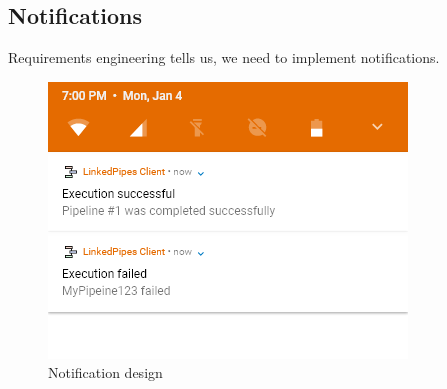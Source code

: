 \subsection{Notifications}
Requirements engineering tells us, we need to implement notifications.

\begin{figure}\centering
    \begin{minipage}[b]{0.7\textwidth}
    	\includegraphics[width=\textwidth]{pics/xd/Notifications.png}
    	\caption[Notifications]{Notification design}\label{fig:xdNotifications}
    \end{minipage}
\end{figure}
